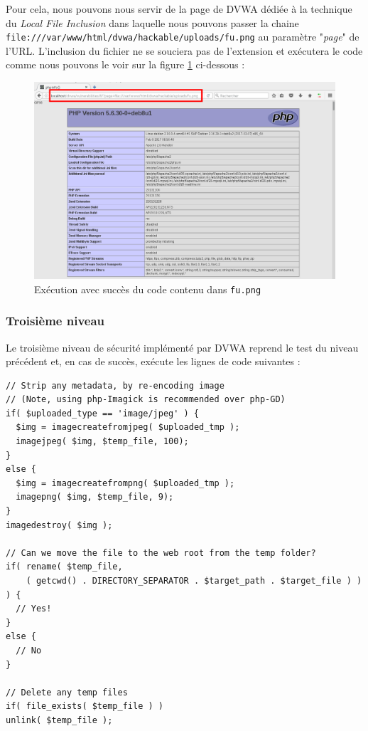 Pour cela, nous pouvons nous servir de la page de DVWA dédiée à la technique du \textit{Local File Inclusion} dans laquelle nous pouvons passer la chaine \texttt{file:///var/www/html/dvwa/hackable/uploads/fu.png} au paramètre "\textit{page}" de l'URL. L'inclusion du fichier ne se souciera pas de l'extension et exécutera le code comme nous pouvons le voir sur la figure \ref{fu_dvwa7} ci-dessous :

\begin{figure}[!h]
\begin{center}
\includegraphics[scale=.35]{images/fu7.png}

\caption{Exécution avec succès du code contenu dans \texttt{fu.png}}
\label{fu_dvwa7}
\end{center}
\end{figure}

\subsubsection{Troisième niveau}

Le troisième niveau de sécurité implémenté par DVWA reprend le test du niveau précédent et, en cas de succès, exécute les lignes de code suivantes :

\begin{lstlisting}
// Strip any metadata, by re-encoding image 
// (Note, using php-Imagick is recommended over php-GD)
if( $uploaded_type == 'image/jpeg' ) {
  $img = imagecreatefromjpeg( $uploaded_tmp );
  imagejpeg( $img, $temp_file, 100);
}
else {
  $img = imagecreatefrompng( $uploaded_tmp );
  imagepng( $img, $temp_file, 9);
}
imagedestroy( $img );

// Can we move the file to the web root from the temp folder?
if( rename( $temp_file, 
    ( getcwd() . DIRECTORY_SEPARATOR . $target_path . $target_file ) ) ) {
  // Yes!
}
else {
  // No
}

// Delete any temp files
if( file_exists( $temp_file ) )
unlink( $temp_file ); 
        
\end{lstlisting}

